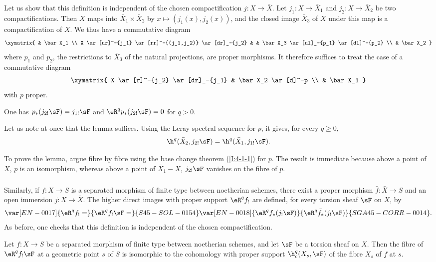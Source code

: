 Let us show that this definition is independent of the chosen
compactification $j:X\to\bar X$. Let $j_1:X\to\bar X_1$ and
$j_2:X\to\bar X_2$ be two compactifications. Then $X$ maps into
$\bar X_1\times\bar X_2$ by $x\mapsto(j_1(x),j_2(x))$, and
the closed image $\bar X_3$ of $X$ under this map is a compactification
of $X$. We thus have a commutative diagram
\[\xymatrix{
  & \bar X_1 \\
  X \ar[ur]^-{j_1} \ar[rr]^-{(j_1,j_2)} \ar[dr]_-{j_2}
    & & \bar X_3 \ar[ul]_-{p_1} \ar[dl]^-{p_2} \\
  & \bar X_2
}\]
where $p_1$ and $p_2$, the restrictions to $\bar X_3$ of the natural
projections, are proper morphisms. It therefore suffices to treat the case
of a commutative diagram
\[\xymatrix{
  X \ar[r]^-{j_2} \ar[dr]_-{j_1}
    & \bar X_2 \ar[d]^-p \\
  & \bar X_1
}\]
with $p$ proper.

\begin{lemma}\label{I:4-5-2}
One has $p_*(j_{2!}\sF)=j_{1!}\sF$ and
$\eR^qp_*(j_{2!}\sF)=0$ for $q>0$.
\end{lemma}

Let us note at once that the lemma suffices. Using the Leray spectral
sequence for $p$, it gives, for every $q\geqslant0$,
\[
  \h^q(\bar X_2, j_{2!} \sF) = \h^q(\bar X_1, j_{1!} \sF) \text{.}
\]

To prove the lemma, argue fibre by fibre using the base change theorem
(\ref{I:4-1-1}) for $p$. The result is immediate because above a point
of $X$, $p$ is an isomorphism, whereas above a point of
$\bar X_1- X$, $j_{2!}\sF$ vanishes on the fibre of $p$.

\subsubsection{}\label{I:4-5-3}

Similarly, if $f:X\to S$ is a separated morphism of finite type between
noetherian schemes, there exist a proper morphism $\bar f:\bar X\to S$
and an open immersion $j:X\to\bar X$. The higher direct images with
proper support $\eR^qf_!$ are defined, for every torsion sheaf $\sF$ on
$X$, by
\[
  \var[EN-0017]{\eR^q f_! =}{\eR^q f_! \sF =}{S45-SOL-0154} \var[EN-0018]{\eR^q f_*(j_! \sF)}{\eR^q \bar f_*(j_! \sF)}{SGA45-CORR-0014} \text{.}
\]
As before, one checks that this definition is independent of the chosen
compactification.

\begin{theorem}\label{I:4-5-4}
Let $f:X\to S$ be a separated morphism of finite type between noetherian
schemes, and let $\sF$ be a torsion sheaf on $X$. Then the fibre of
$\eR^qf_!\sF$ at a geometric point $s$ of $S$ is isomorphic to the
cohomology with proper support $\h_c^q(X_s,\sF)$ of the fibre $X_s$ of
$f$ at $s$.
\end{theorem}

